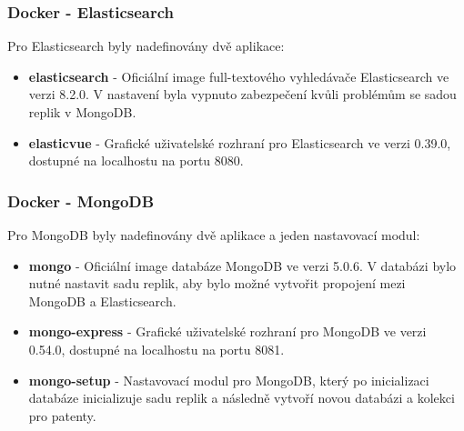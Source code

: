\subsubsection{Docker - Elasticsearch}
Pro Elasticsearch byly nadefinovány dvě aplikace:
\begin{itemize}
\item \textbf{elasticsearch} - Oficiální image full-textového vyhledávače Elasticsearch ve verzi 8.2.0. V nastavení byla vypnuto zabezpečení kvůli problémům se sadou replik v MongoDB.
\item \textbf{elasticvue} - Grafické uživatelské rozhraní pro Elasticsearch ve verzi 0.39.0, dostupné na localhostu na portu 8080.
\end{itemize}

\subsubsection{Docker - MongoDB}
Pro MongoDB byly nadefinovány dvě aplikace a jeden nastavovací modul:
\begin{itemize}
\item \textbf{mongo} - Oficiální image databáze MongoDB ve verzi 5.0.6. V databázi bylo nutné nastavit sadu replik, aby bylo možné vytvořit propojení mezi MongoDB a Elasticsearch.
\item \textbf{mongo-express} - Grafické uživatelské rozhraní pro MongoDB ve verzi 0.54.0, dostupné na localhostu na portu 8081.
\item \textbf{mongo-setup} - Nastavovací modul pro MongoDB, který po inicializaci databáze inicializuje sadu replik a následně vytvoří novou databázi a kolekci pro patenty.
\end{itemize}


